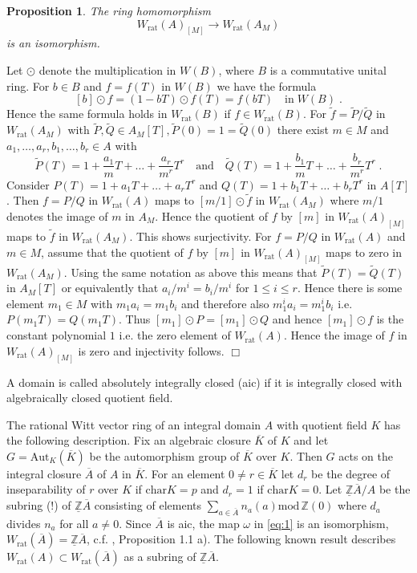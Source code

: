 \documentclass[12pt,leqno]{article}
\newcommand{\Z}{{\mathbb{Z}}}
\newcommand{\uZ}{\underline{\Z}}
\newcommand{\tf}{\tilde{f}}
\newcommand{\tQ}{\tilde{Q}}
\newcommand{\car}{\mathrm{char}}
\renewcommand{\mod}{\mathrm{mod}\,}
\newcommand{\Aut}{\mathrm{Aut}}
\newcommand{\rat}{\mathrm{rat}}
\newcommand{\onA}{\overline{A}}
\newcommand{\oK}{\overline{K}}
\newcommand{\tP}{\tilde{P}}
\newtheorem{prop}[theorem]{Proposition}
\newenvironment{proof}{\noindent {\bf Proof}}{\mbox{}\hspace*{\fill}$\Box$}
\begin{document}
\begin{prop}
\label{t1.1n}
The ring homomorphism
\[
W_{\rat} (A)_{[M]} \longrightarrow W_{\rat} (A_M)
\]
is an isomorphism.
\end{prop}

\begin{proof}
Let $\odot$ denote the multiplication in $W (B)$, where $B$ is a commutative unital ring. For $b \in B$ and $f = f (T)$ in $W (B)$ we have the formula
\[
[b] \odot f = (1 - bT) \odot f (T) = f (bT) \quad \text{in} \; W (B) \; .
\]
Hence the same formula holds in $W_{\rat} (B)$ if $f \in W_{\rat} (B)$. For $\tf = \tP / \tQ$ in $W_{\rat} (A_M)$ with $\tP , \tQ \in A_M [T] , \tP (0) = 1 = \tQ (0)$ there exist $m \in M$ and $a_1 , \ldots , a_r , b_1 , \ldots , b_r \in A$ with
\[
\tP (T) = 1 + \frac{a_1}{m} T + \ldots + \frac{a_r}{m^r} T^r \quad \text{and} \quad \tQ (T) = 1 + \frac{b_1}{m} T + \ldots + \frac{b_r}{m^r} T^r \; .
\]
Consider $P (T) = 1 + a_1 T + \ldots + a_r T^r$ and $Q (T) = 1 + b_1 T + \dots + b_r T^r$ in $A [T]$. Then $f = P / Q$ in $W_{\rat} (A)$ maps to $[m / 1] \odot \tf$ in $W_{\rat} (A_M)$ where $m / 1$ denotes the image of $m$ in $A_M$. Hence the quotient of $f$ by $[m]$ in $W_{\rat} (A)_{[M]}$ maps to $\tf$ in $W_{\rat} (A_M)$. This shows surjectivity. For $f = P / Q$ in $W_{\rat} (A)$ and $m \in M$, assume that the quotient of $f$ by $[m]$ in $W_{\rat} (A)_{[M]}$ maps to zero in $W_{\rat} (A_M)$. Using the same notation as above this means that $\tP (T) = \tQ (T)$ in $A_M [T]$ or equivalently that $a_i / m^i = b_i / m^i$ for $1 \le i \le r$. Hence there is some element $m_1 \in M$ with $m_1 a_i = m_1 b_i$ and therefore also $m^i_1 a_i = m^i_1 b_i$ i.e. $P (m_1 T) = Q (m_1 T)$. Thus $[m_1] \odot P = [m_1] \odot Q$ and hence $[m_1] \odot f$ is the constant polynomial $1$ i.e. the zero element of $W_{\rat} (A)$. Hence the image of $f$ in $W_{\rat} (A)_{[M]}$ is zero and injectivity follows. 
\end{proof}

A domain is called absolutely integrally closed (aic) if it is integrally closed with algebraically closed quotient field. 

The rational Witt vector ring of an integral domain $A$ with quotient field $K$ has the following description. Fix an algebraic closure $\oK$ of $K$ and let $G = \Aut_{K} (\oK)$ be the automorphism group of $\oK$ over $K$. Then $G$ acts on the integral closure $\onA$ of $A$ in $\oK$. For an element $0 \neq r \in \oK$ let $d_r$ be the degree of inseparability of $r$ over $K$ if $\car K = p$ and $d_r = 1$ if $\car K = 0$. Let $\uZ \onA / A$ be the subring (!) of $\uZ \onA$ consisting of elements $\sum_{a \in \onA} n_a (a) \mod \Z (0)$ where $d_a$ divides $n_a$ for all $a \neq 0$. Since $\onA$ is aic, the map $\omega$ in \eqref{eq:1} is an isomorphism, $W_{\rat} (\onA) = \uZ \onA$, c.f. \cite{D}, Proposition 1.1 a). The following known result describes $W_{\rat} (A) \subset W_{\rat} (\onA)$ as a subring of $\uZ \onA$. 
\end{document}

